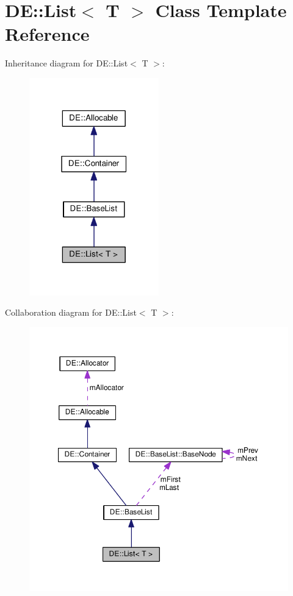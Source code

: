 \hypertarget{classDE_1_1List}{}\section{DE\+:\+:List$<$ T $>$ Class Template Reference}
\label{classDE_1_1List}


Inheritance diagram for DE\+:\+:List$<$ T $>$\+:\nopagebreak
\begin{figure}[H]
\begin{center}
\leavevmode
\includegraphics[width=159pt]{classDE_1_1List__inherit__graph}
\end{center}
\end{figure}


Collaboration diagram for DE\+:\+:List$<$ T $>$\+:\nopagebreak
\begin{figure}[H]
\begin{center}
\leavevmode
\includegraphics[width=350pt]{classDE_1_1List__coll__graph}
\end{center}
\end{figure}

